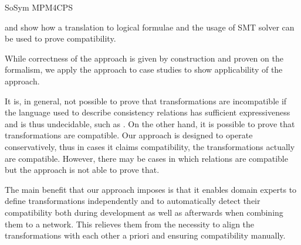 \begin{copiedFrom}{SoSym MPM4CPS}
\begin{description}[leftmargin=\parindent]
    \qvtr and show how a translation to logical formulae and the usage of SMT solver can be used to prove compatibility.
    \item[\contributionlabel{contrib:evaluation}{Applicability Evaluation}{C4}:] While correctness of the approach is given by construction and proven on the formalism, we apply the approach to case studies to show applicability of the approach. 
\end{description}


It is, in general, not possible to prove that transformations are incompatible if the language used to describe consistency relations has sufficient expressiveness and is thus undecidable, such as \qvtr.
On the other hand, it is possible to prove that transformations are compatible.
Our approach is designed to operate conservatively, thus in cases it claims compatibility, the transformations actually are compatible.
However, there may be cases in which relations are compatible but the approach is not able to prove that.

The main benefit that our approach imposes is that it enables domain experts to define transformations independently and %
to automatically detect their compatibility both during development as well as afterwards when combining them to a network.
This relieves them from the necessity to align the transformations with each other a priori and ensuring compatibility manually.





\end{copiedFrom}

